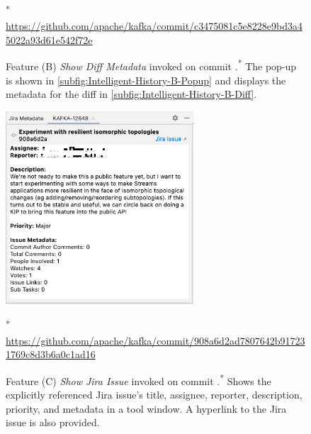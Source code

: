 \begin{figure}
    \centering%
    \qquad
    \caption{
        Feature (B) \textit{Show Diff Metadata} invoked on commit .\textsuperscript{*} The pop-up is shown in \autoref{subfig:Intelligent-History-B-Popup} and displays the metadata for the diff in \autoref{subfig:Intelligent-History-B-Diff}.
    }%
    \scriptsize\textsuperscript{*} \url{https://github.com/apache/kafka/commit/c3475081c5e8228e9bd3a45022a93d61e542f72e}
    \label{fig:Intelligent-History-B}%
\end{figure}

\begin{figure}
    \center
    \includegraphics[width=7cm]{./images/intelligent-history-C.png}
    \caption{
        Feature (C) \textit{Show Jira Issue} invoked on commit .\textsuperscript{*}
        Shows the explicitly referenced Jira issue's title, assignee, reporter, description, priority, and metadata in a tool window. A hyperlink to the Jira issue is also provided.
    }
    \scriptsize\textsuperscript{*} \url{https://github.com/apache/kafka/commit/908a6d2ad7807642b917231769c8d3b6a0c1ad16}
    \label{fig:Intelligent-History-C}
\end{figure}

